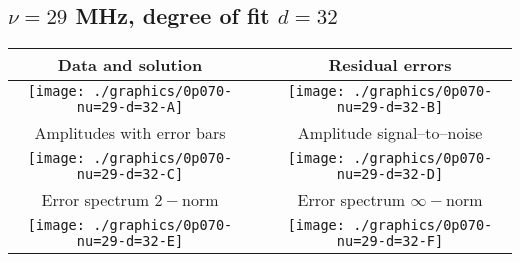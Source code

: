 

% 

\clearpage{}
\break{}

\subsection{$\nu = 29$ MHz, degree of fit $d = 32$}

\begin{table}[h]
    \begin{center}
        \begin{tabular}{ccc}
            Data and solution & \quad & Residual errors \\\hline
            \texttt{[image: ./graphics/0p070-nu=29-d=32-A]} &&
            \texttt{[image: ./graphics/0p070-nu=29-d=32-B]} \\[15pt]
            Amplitudes with error bars && Amplitude signal--to--noise \\\hline
            \texttt{[image: ./graphics/0p070-nu=29-d=32-C]} &&
            \texttt{[image: ./graphics/0p070-nu=29-d=32-D]} \\[15pt]
            Error spectrum $2-$norm && Error spectrum $\infty-$norm \\\hline
            \texttt{[image: ./graphics/0p070-nu=29-d=32-E]} &&
            \texttt{[image: ./graphics/0p070-nu=29-d=32-F]} \\[15pt]
        \end{tabular}
    \end{center}
\label{fig:elev=70, nu=29}
\end{table}



\endinput
